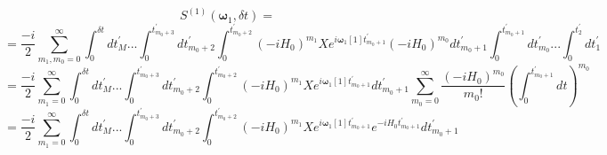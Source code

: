 \begin{equation*}
    S^{(1)}(\boldsymbol{\omega}_1, \delta t) = 
\end{equation*}
\begin{equation*}
    = \frac{-i}{2}\sum_{m_1,m_0 = 0}^{\infty} \int_{0}^{\delta t}dt^{'}_M...\int_{0}^{t^{'}_{m_0 + 3}}dt^{'}_{m_0 + 2}\int_{0}^{t^{'}_{m_0 + 2}}(-iH_0)^{m_1}Xe^{i\boldsymbol{\omega}_1[1]t^{'}_{m_0+1}}(-iH_0)^{m_0}  dt^{'}_{m_0 + 1} \int_{0}^{t^{'}_{m_0 + 1}}dt^{'}_{m_0}... \int_{0}^{t_2^{'}}dt_1^{'}
\end{equation*}
\begin{equation*}
    = \frac{-i}{2}\sum_{m_1= 0}^{\infty}\int_{0}^{\delta t}dt^{'}_M...\int_{0}^{t^{'}_{m_0 + 3}}dt^{'}_{m_0 + 2}\int_{0}^{t^{'}_{m_0 + 2}}(-iH_0)^{m_1}Xe^{i\boldsymbol{\omega}_1[1]t^{'}_{m_0+1}}dt^{'}_{m_0 + 1} \sum_{m_0 = 0}^{\infty} \frac{(-iH_0)^{m_0}}{m_0!} \left(\int_{0}^{t^{'}_{m_0+1}}dt\right)^{m_0}
\end{equation*}
\begin{equation*}
    = \frac{-i}{2}\sum_{m_1= 0}^{\infty}\int_{0}^{\delta t}dt^{'}_M...\int_{0}^{t^{'}_{m_0 + 3}}dt^{'}_{m_0 + 2}\int_{0}^{t^{'}_{m_0 + 2}}(-iH_0)^{m_1}Xe^{i\boldsymbol{\omega}_1[1]t^{'}_{m_0+1}} e^{-iH_0 t^{'}_{m_0 +1}}dt^{'}_{m_0 + 1}
\end{equation*}





